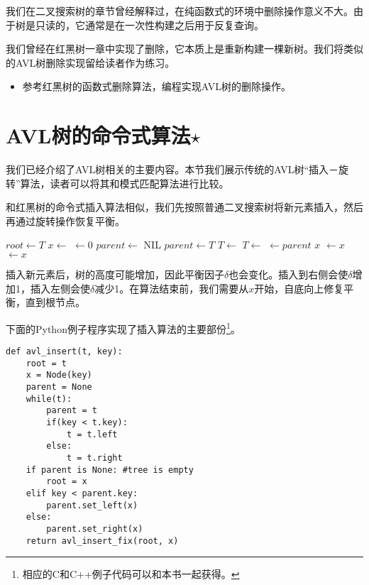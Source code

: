 \documentclass[UTF8]{article}
\begin{document}
我们在二叉搜索树的章节曾经解释过，在纯函数式的环境中删除操作意义不大。由于树是只读的，它通常是在一次性构建之后用于反复查询。

我们曾经在红黑树一章中实现了删除，它本质上是重新构建一棵新树。我们将类似的AVL树删除实现留给读者作为练习。

\begin{Exercise}

\begin{itemize}
\item 参考红黑树的函数式删除算法，编程实现AVL树的删除操作。
\end{itemize}

\end{Exercise}

\section{AVL树的命令式算法$\star$}

我们已经介绍了AVL树相关的主要内容。本节我们展示传统的AVL树“插入－旋转”算法，读者可以将其和模式匹配算法进行比较。

和红黑树的命令式插入算法相似，我们先按照普通二叉搜索树将新元素插入，然后再通过旋转操作恢复平衡。

\begin{algorithmic}[1]
  \State $root \gets T$
  \State $x \gets$ 
  \State {} $\gets 0$
  \State $parent \gets$ NIL
    \State $parent \gets T$
      \State $T \gets $ 
    \Else
      \State $T \gets $ 
    \EndIf
  \EndWhile
  \State {} $\gets parent$
   
    \State \Return $x$
    \State {} $\gets x$
  \Else
    \State {} $\gets x$
  \EndIf
  \State \Return {}
\EndFunction
\end{algorithmic}

插入新元素后，树的高度可能增加，因此平衡因子$\delta$也会变化。插入到右侧会使$\delta$增加1，插入左侧会使$\delta$减少1。在算法结束前，我们需要从$x$开始，自底向上修复平衡，直到根节点。

下面的Python例子程序实现了插入算法的主要部份\footnote{相应的C和C++例子代码可以和本书一起获得。}。
\lstset{language=Python}
\begin{lstlisting}
def avl_insert(t, key):
    root = t
    x = Node(key)
    parent = None
    while(t):
        parent = t
        if(key < t.key):
            t = t.left
        else:
            t = t.right
    if parent is None: #tree is empty
        root = x
    elif key < parent.key:
        parent.set_left(x)
    else:
        parent.set_right(x)
    return avl_insert_fix(root, x)
\end{lstlisting}
\end{document}
